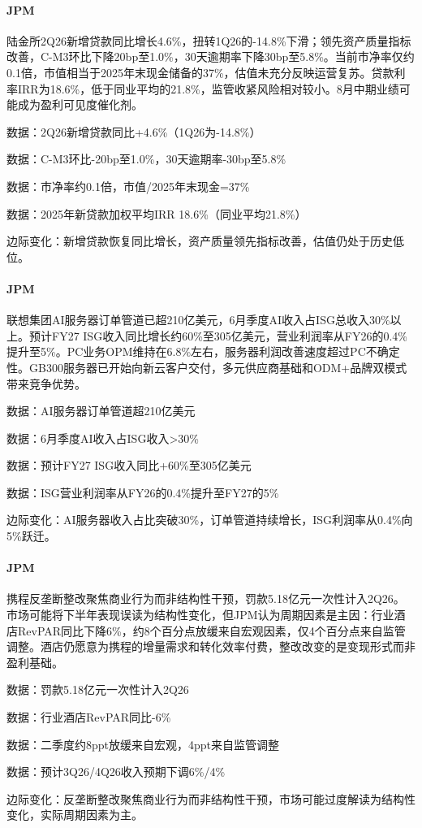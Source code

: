 \documentclass[11pt]{ctexart}
\begin{document}
\paragraph{JPM} 陆金所2Q26新增贷款同比增长4.6\%，扭转1Q26的-14.8\%下滑；领先资产质量指标改善，C-M3环比下降20bp至1.0\%，30天逾期率下降30bp至5.8\%。当前市净率仅约0.1倍，市值相当于2025年末现金储备的37\%，估值未充分反映运营复苏。贷款利率IRR为18.6\%，低于同业平均的21.8\%，监管收紧风险相对较小。8月中期业绩可能成为盈利可见度催化剂。
{\small\color{refgray}数据：2Q26新增贷款同比+4.6\%（1Q26为-14.8\%）\par}
{\small\color{refgray}数据：C-M3环比-20bp至1.0\%，30天逾期率-30bp至5.8\%\par}
{\small\color{refgray}数据：市净率约0.1倍，市值/2025年末现金=37\%\par}
{\small\color{refgray}数据：2025年新贷款加权平均IRR 18.6\%（同业平均21.8\%）\par}
{\small\color{refgray}边际变化：新增贷款恢复同比增长，资产质量领先指标改善，估值仍处于历史低位。\par}
\paragraph{JPM} 联想集团AI服务器订单管道已超210亿美元，6月季度AI收入占ISG总收入30\%以上。预计FY27 ISG收入同比增长约60\%至305亿美元，营业利润率从FY26的0.4\%提升至5\%。PC业务OPM维持在6.8\%左右，服务器利润改善速度超过PC不确定性。GB300服务器已开始向新云客户交付，多元供应商基础和ODM+品牌双模式带来竞争优势。
{\small\color{refgray}数据：AI服务器订单管道超210亿美元\par}
{\small\color{refgray}数据：6月季度AI收入占ISG收入>30\%\par}
{\small\color{refgray}数据：预计FY27 ISG收入同比+60\%至305亿美元\par}
{\small\color{refgray}数据：ISG营业利润率从FY26的0.4\%提升至FY27的5\%\par}
{\small\color{refgray}边际变化：AI服务器收入占比突破30\%，订单管道持续增长，ISG利润率从0.4\%向5\%跃迁。\par}
\paragraph{JPM} 携程反垄断整改聚焦商业行为而非结构性干预，罚款5.18亿元一次性计入2Q26。市场可能将下半年表现误读为结构性变化，但JPM认为周期因素是主因：行业酒店RevPAR同比下降6\%，约8个百分点放缓来自宏观因素，仅4个百分点来自监管调整。酒店仍愿意为携程的增量需求和转化效率付费，整改改变的是变现形式而非盈利基础。
{\small\color{refgray}数据：罚款5.18亿元一次性计入2Q26\par}
{\small\color{refgray}数据：行业酒店RevPAR同比-6\%\par}
{\small\color{refgray}数据：二季度约8ppt放缓来自宏观，4ppt来自监管调整\par}
{\small\color{refgray}数据：预计3Q26/4Q26收入预期下调6\%/4\%\par}
{\small\color{refgray}边际变化：反垄断整改聚焦商业行为而非结构性干预，市场可能过度解读为结构性变化，实际周期因素为主。\par}
\end{document}
